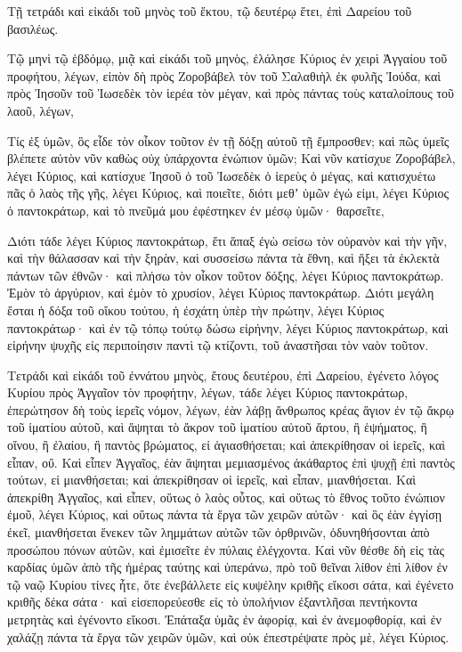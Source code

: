 \begin{spacing}{1.1}
\begin{multicols}{2}
Τῇ τετράδι καὶ εἰκάδι τοῦ μηνὸς τοῦ ἕκτου, τῷ δευτέρῳ ἔτει, ἐπὶ Δαρείου τοῦ βασιλέως.

Τῷ μηνὶ τῷ ἑβδόμῳ, μιᾷ καὶ εἰκάδι τοῦ μηνὸς, ἐλάλησε Κύριος ἐν χειρὶ Ἀγγαίου τοῦ προφήτου, λέγων,
εἰπὸν δὴ πρὸς Ζοροβάβελ τὸν τοῦ Σαλαθιὴλ ἐκ φυλῆς Ἰούδα, καὶ πρὸς Ἰησοῦν τοῦ Ἰωσεδὲκ τὸν ἱερέα τὸν μέγαν, καὶ πρὸς πάντας τοὺς καταλοίπους τοῦ λαοῦ, λέγων,

Τίς ἐξ ὑμῶν, ὃς εἶδε τὸν οἶκον τοῦτον ἐν τῇ δόξῃ αὐτοῦ τῇ ἔμπροσθεν; καὶ πῶς ὑμεῖς βλέπετε αὐτὸν νῦν καθὼς οὐχ ὑπάρχοντα ἐνώπιον ὑμῶν;
Καὶ νῦν κατίσχυε Ζοροβάβελ, λέγει Κύριος, καὶ κατίσχυε Ἰησοῦ ὁ τοῦ Ἰωσεδὲκ ὁ ἱερεὺς ὁ μέγας, καὶ κατισχυέτω πᾶς ὁ λαὸς τῆς γῆς, λέγει Κύριος, καὶ ποιεῖτε, διότι μεθʼ ὑμῶν ἐγώ εἰμι, λέγει Κύριος ὁ παντοκράτωρ,
καὶ τὸ πνεῦμά μου ἐφέστηκεν ἐν μέσῳ ὑμῶν· θαρσεῖτε,

Διότι τάδε λέγει Κύριος παντοκράτωρ, ἔτι ἅπαξ ἐγὼ σείσω τὸν οὐρανὸν καὶ τὴν γῆν, καὶ τὴν θάλασσαν καὶ τὴν ξηρὰν,
καὶ συσσείσω πάντα τὰ ἔθνη, καὶ ἥξει τὰ ἐκλεκτὰ πάντων τῶν ἐθνῶν· καὶ πλήσω τὸν οἶκον τοῦτον δόξης, λέγει Κύριος παντοκράτωρ.
Ἐμὸν τὸ ἀργύριον, καὶ ἐμὸν τὸ χρυσίον, λέγει Κύριος παντοκράτωρ.
Διότι μεγάλη ἔσται ἡ δόξα τοῦ οἴκου τούτου, ἡ ἐσχάτη ὑπὲρ τὴν πρώτην, λέγει Κύριος παντοκράτωρ· καὶ ἐν τῷ τόπῳ τούτῳ δώσω εἰρήνην, λέγει Κύριος παντοκράτωρ, καὶ εἰρήνην ψυχῆς εἰς περιποίησιν παντὶ τῷ κτίζοντι, τοῦ ἀναστῆσαι τὸν ναὸν τοῦτον.

Τετράδι καὶ εἰκάδι τοῦ ἐννάτου μηνὸς, ἔτους δευτέρου, ἐπὶ Δαρείου, ἐγένετο λόγος Κυρίου πρὸς Ἀγγαῖον τὸν προφήτην, λέγων,
τάδε λέγει Κύριος παντοκράτωρ, ἐπερώτησον δὴ τοὺς ἱερεῖς νόμον, λέγων,
ἐὰν λάβῃ ἄνθρωπος κρέας ἅγιον ἐν τῷ ἄκρῳ τοῦ ἱματίου αὐτοῦ, καὶ ἅψηται τὸ ἄκρον τοῦ ἱματίου αὐτοῦ ἄρτου, ἢ ἑψήματος, ἢ οἴνου, ἢ ἐλαίου, ἢ παντὸς βρώματος, εἰ ἁγιασθήσεται; καὶ ἀπεκρίθησαν οἱ ἱερεῖς, καὶ εἶπαν, οὔ.
Καὶ εἶπεν Ἀγγαῖος, ἐὰν ἅψηται μεμιασμένος ἀκάθαρτος ἐπὶ ψυχῇ ἐπὶ παντὸς τούτων, εἰ μιανθήσεται; καὶ ἀπεκρίθησαν οἱ ἱερεῖς, καὶ εἶπαν, μιανθήσεται.
Καὶ ἀπεκρίθη Ἀγγαῖος, καὶ εἶπεν, οὕτως ὁ λαὸς οὗτος, καὶ οὕτως τὸ ἔθνος τοῦτο ἐνώπιον ἐμοῦ, λέγει Κύριος, καὶ οὕτως πάντα τὰ ἔργα τῶν χειρῶν αὐτῶν· καὶ ὃς ἐὰν ἐγγίσῃ ἐκεῖ, μιανθήσεται ἕνεκεν τῶν λημμάτων αὐτῶν τῶν ὀρθρινῶν, ὀδυνηθήσονται ἀπὸ προσώπου πόνων αὐτῶν, καὶ ἐμισεῖτε ἐν πύλαις ἐλέγχοντα.
Καὶ νῦν θέσθε δὴ εἰς τὰς καρδίας ὑμῶν ἀπὸ τῆς ἡμέρας ταύτης καὶ ὑπεράνω, πρὸ τοῦ θεῖναι λίθον ἐπὶ λίθον ἐν τῷ ναῷ Κυρίου
τίνες ἦτε, ὅτε ἐνεβάλλετε εἰς κυψέλην κριθῆς εἴκοσι σάτα, καὶ ἐγένετο κριθῆς δέκα σάτα· καὶ εἰσεπορεύεσθε εἰς τὸ ὑπολήνιον ἐξαντλῆσαι πεντήκοντα μετρητὰς καὶ ἐγένοντο εἴκοσι.
Ἐπάταξα ὑμᾶς ἐν ἀφορίᾳ, καὶ ἐν ἀνεμοφθορίᾳ, καὶ ἐν χαλάζῃ πάντα τὰ ἔργα τῶν χειρῶν ὑμῶν, καὶ οὐκ ἐπεστρέψατε πρὸς μὲ, λέγει Κύριος.


\end{multicols}
\end{spacing}

